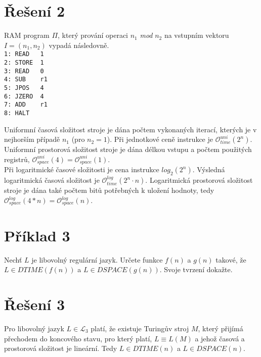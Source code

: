 \documentclass[a4paper, 11pt, fleqn]{scrartcl}
\begin{document}
  \section*{Řešení 2}
    RAM program $\Pi$, který prování operaci $n_1$ \textit{mod} $n_2$ na vstupním vektoru $I = (n_1 , n_2)$ vypadá následovně.\\

    \texttt{1: READ~~~1\\
    2: STORE~~1\\
    3: READ~~~0\\
    4: SUB~~~~r1\\
    5: JPOS~~~4\\
    6: JZERO~~4\\
    7: ADD~~~~r1\\
    8: HALT\\
   }

   Uniformní časová složitost stroje je dána počtem vykonaných iterací, kterých je v nejhorším případě $n_1$ (pro $n_2 = 1$). Při jednotkové ceně instrukce je $\mathcal{O}^{uni}_{time}(2^n)$. Uniformní prostorová složitost stroje je dána délkou vstupu a počtem použitých registrů, $\mathcal{O}^{uni}_{space}(4) = \mathcal{O}^{uni}_{space}(1)$.\\

   Při logaritmické časové složitosti je cena instrukce $\textit{log}_2(2^n)$. Výsledná logaritmická časová složitost je $\mathcal{O}^{log}_{time}(2^n\cdot n)$. Logaritmická prostorová složitost stroje je dána také počtem bitů potřebných k uložení hodnoty, tedy $\mathcal{O}^{log}_{space}(4*n) = \mathcal{O}^{log}_{space}(n)$.


 \section*{Příklad 3}
   Nechť $L$ je libovolný regulární jazyk. Určete funkce $f(n)$ a $g(n)$ takové, že $L \in \textit{DTIME}(f(n))$ a $L \in \textit{DSPACE}(g(n))$. Svoje tvrzení dokažte.

 \section*{Řešení 3}
   Pro libovolný jazyk $L \in \mathcal{L}_3$ platí, že existuje Turingův stroj $M$, který přijímá přechodem do koncového stavu, pro který platí, $L \equiv L(M)$ a jehož časová a prostorová složitost je lineární. Tedy $L \in \textit{DTIME}(n)$ a $L \in \textit{DSPACE}(n)$.
\end{document}
